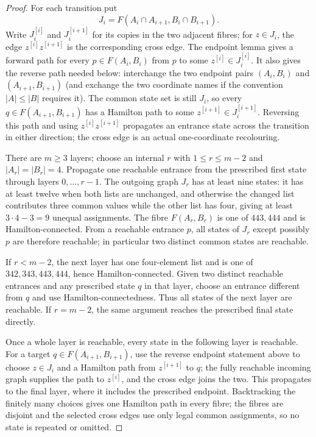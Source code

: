 \documentclass[11pt]{article}
\theoremstyle{remark}
\numberwithin{equation}{section}
\numberwithin{table}{section}
\begin{document}
\begin{proof}
For each transition put
\[
 J_i=F(A_i\cap A_{i+1},B_i\cap B_{i+1}).
\]
Write $J_i^{[i]}$ and $J_i^{[i+1]}$ for its copies in the two adjacent
fibres; for $z\in J_i$, the edge
$z^{[i]}z^{[i+1]}$ is the corresponding cross edge.  The endpoint
lemma gives a forward path for every $p\in F(A_i,B_i)$ from $p$ to
some $z^{[i]}\in J_i^{[i]}$.  It also gives the reverse path needed
below: interchange the two endpoint pairs
$(A_i,B_i)$ and $(A_{i+1},B_{i+1})$ (and exchange the two coordinate
names if the convention $|A|\le|B|$ requires it).  The common state set
is still $J_i$, so every $q\in F(A_{i+1},B_{i+1})$ has a Hamilton path
to some $z^{[i+1]}\in J_i^{[i+1]}$.  Reversing this path and using
$z^{[i]}z^{[i+1]}$ propagates an entrance state across the transition in
either direction; the cross edge is an actual one-coordinate
recolouring.

There are $m\ge3$ layers; choose an internal $r$ with
$1\le r\le m-2$ and $|A_r|=|B_r|=4$.  Propagate one reachable entrance
from the prescribed first state through layers $0,\ldots,r-1$.  The
outgoing graph $J_r$ has at least nine states: it has at least twelve when
both lists are unchanged, and otherwise the changed list contributes
three common values while the other list has four, giving at least
$3\cdot4-3=9$ unequal assignments.  The fibre $F(A_r,B_r)$ is one of
$443,444$ and is Hamilton-connected.  From a reachable entrance $p$,
all states of $J_r$ except possibly $p$ are therefore reachable; in
particular two distinct common states are reachable.

If $r<m-2$, the next layer has one four-element list and is one of
$342,343,443,444$, hence Hamilton-connected.  Given two distinct
reachable entrances and any prescribed state $q$ in that layer, choose
an entrance different from $q$ and use Hamilton-connectedness.  Thus
all states of the next layer are reachable.  If $r=m-2$, the same
argument reaches the prescribed final state directly.

Once a whole layer is reachable, every state in the following layer is
reachable.  For a target $q\in F(A_{i+1},B_{i+1})$, use the reverse
endpoint statement above to choose $z\in J_i$ and a Hamilton path from
$z^{[i+1]}$ to $q$; the fully reachable incoming graph supplies the
path to $z^{[i]}$, and the cross edge joins the two.  This propagates to
the final layer, where it includes the prescribed endpoint.
Backtracking the finitely many choices gives one Hamilton path in every
fibre; the fibres are disjoint and the selected cross edges use only
legal common assignments, so no state is repeated or omitted.
\end{proof}
\end{document}
